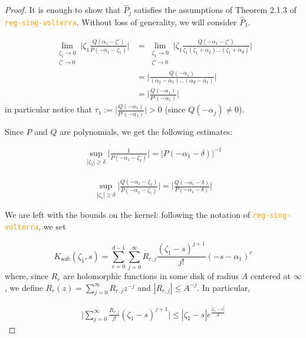 \documentclass{article}
\theoremstyle{definition}
\begin{document}
\begin{proof}
It is enough to show that $\hat{P}_j$ satisfies the assumptions of Theorem 2.1.3 of \textcolor{orange}{\texttt{reg-sing-volterra}}. Without loss of generality, we will consider $\hat{P}_1$. 

\begin{align*}
    \lim_{\substack{\zeta_1\to 0\\ \zeta'\to 0}}\Big\vert \zeta_1\frac{Q(\alpha_1-\zeta')}{P(-\alpha_1-\zeta_1)}\Big\vert &=\lim_{\substack{\zeta_1\to 0\\ \zeta'\to 0}}\Big\vert \zeta_1\frac{Q(-\alpha_1-\zeta')}{\zeta_1(\zeta_1+\alpha_2)...(\zeta_1+\alpha_d)}\Big\vert\\
    &=\Big\vert \frac{Q(-\alpha_1)}{(\alpha_2-\alpha_1)...(\alpha_d-\alpha_1)}\Big\vert\\
    &=\Big\vert\frac{Q(-\alpha_1)}{P'(-\alpha_1)}\Big\vert
\end{align*}
in particular notice that $\tau_1:=\Big\vert\frac{Q(-\alpha_1)}{P'(-\alpha_1)}\Big\vert>0$ (since $Q(-\alpha_j)\neq 0$). 

Since $P$ and $Q$ are polynomials, we get the following estimates:

\begin{align*}
    \sup_{|\zeta_1|\geq\delta}\Big\vert\frac{1}{P(-\alpha_1-\zeta_1)}\Big\vert=|P(-\alpha_1-\delta)|^{-1}
\end{align*}

\begin{align*}
    \sup_{|\zeta_1|\geq\delta}\Big\vert\frac{Q(-\alpha_1-\zeta_1)}{P(-\alpha_1-\zeta_1)}\Big\vert=\Big\vert\frac{Q(-\alpha_1-\delta)}{P(-\alpha_1-\delta)}\Big\vert
\end{align*}

We are left with the bounds on the kernel: following the notation of \textcolor{orange}{\texttt{reg-sing-volterra}}, we set 

\begin{equation}
    K_{\text{soft}}(\zeta_1,s)=\sum_{r=0}^{d-1}\sum_{j=0}^{\infty}R_{r,j}\frac{(\zeta_1-s)^{j+1}}{j!}(-s-\alpha_1)^r
\end{equation}
where, since $R_r$ are holomorphic functions in some disk of radius $A$ centered at $\infty$, we define $R_r(z)=\sum_{j=0}^\infty R_{r,j}z^{-j}$ and $|R_{r,j}|\leq A^{-j}$. In particular,  

\begin{align*}
    \Big\vert \sum_{j=0}^\infty \frac{R_{r,j}}{j!}(\zeta_1-s)^{j+1}\Big\vert \leq |\zeta_1-s| e^{\frac{|\zeta_1-s|}{A}}
\end{align*}


\end{proof}
\end{document}
